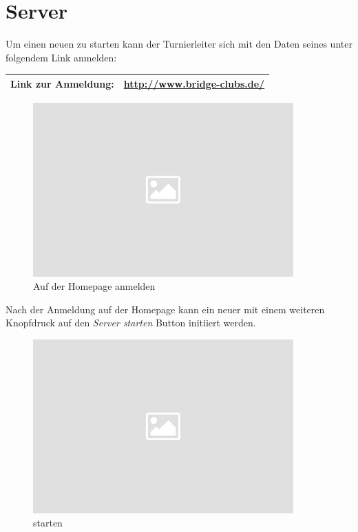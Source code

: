 \section{Server}\label{ser/intro}

\noindent
Um einen neuen \bb \ser zu starten kann der Turnierleiter sich mit
den Daten seines \bcs unter folgendem Link anmelden:

\begin{center}
  \begin{tabular}{|ll|}
    \hline
    \textbf{Link zur Anmeldung:} &\href{http://www.bridge-clubs.de/}{http://www.bridge-clubs.de/}\\
    \hline
  \end{tabular}
\end{center}

\noindent
\begin{figure}[ht]
	\centering
  \includegraphics[width=10cm]{pictures/placeholder.png}
	\caption{Auf der Homepage anmelden}
	\label{pic/cli_intro_login}
\end{figure}

\noindent
Nach der Anmeldung auf der \bb Homepage kann ein neuer \ser mit einem weiteren Knopfdruck auf den \textit{Server starten} Button initiiert werden.\\[.1cm]

\noindent
\begin{figure}[ht]
	\centering
  \includegraphics[width=10cm]{pictures/placeholder.png}
	\caption{\ser starten}
	\label{pic/ser_intro_init}
\end{figure}
